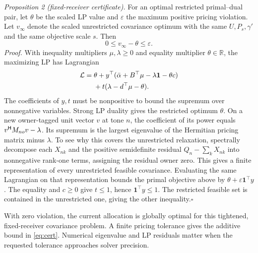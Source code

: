\emph{Proposition 2 (fixed-receiver certificate).} For an optimal restricted primal--dual pair, let $\theta$ be the scaled LP value and $\varepsilon$ the maximum positive pricing violation. Let $v_\infty$ denote the scaled unrestricted covariance optimum with the same $U,P_s,\gamma'$ and the same objective scale $s$. Then
\begin{equation}
 0\le v_\infty-\theta\le\varepsilon .\label{eq:cert}
\end{equation}
\emph{Proof.} With inequality multipliers $\mu,\lambda\ge0$ and equality multiplier $\theta\in\mathbb R$, the maximizing LP has Lagrangian
\begin{align}
 \mathcal L={}&\theta+
 y^\top(\bar\alpha+B^\top\mu-\lambda\mathbf1-\theta c)\notag\\
 &+t(\lambda-d^\top\mu-\theta).
\end{align}
The coefficients of $y,t$ must be nonpositive to bound the supremum over nonnegative variables. Strong LP duality gives the restricted optimum $\theta$. On a new owner-tagged unit vector $v$ at tone $n$, the coefficient of its power equals $v^{\mathsf H} M_{no}v-\lambda$. Its supremum is the largest eigenvalue of the Hermitian pricing matrix minus $\lambda$. To see why this covers the unrestricted relaxation, spectrally decompose each $X_{nk}$ and the positive semidefinite residual $Q_n-\sum_k X_{nk}$ into nonnegative rank-one terms, assigning the residual owner zero. This gives a finite representation of every unrestricted feasible covariance. Evaluating the same Lagrangian on that representation bounds the primal objective above by $\theta+\varepsilon\mathbf1^\top y$. The equality and $c\ge0$ give $t\le1$, hence $\mathbf1^\top y\le1$. The restricted feasible set is contained in the unrestricted one, giving the other inequality.\hfill$\square$

With zero violation, the current allocation is globally optimal for this tightened, fixed-receiver covariance problem. A finite pricing tolerance gives the additive bound in \eqref{eq:cert}. Numerical eigenvalue and LP residuals matter when the requested tolerance approaches solver precision.
